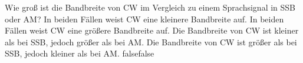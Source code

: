     {Wie groß ist die Bandbreite von CW im Vergleich zu einem Sprachsignal in SSB oder AM?}
    {In beiden Fällen weist CW eine kleinere Bandbreite auf.}
    {In beiden Fällen weist CW eine größere Bandbreite auf.}
    {Die Bandbreite von CW ist kleiner als bei SSB, jedoch größer als bei AM.}
    {Die Bandbreite von CW ist größer als bei SSB, jedoch kleiner als bei AM.}
    {false}{false}